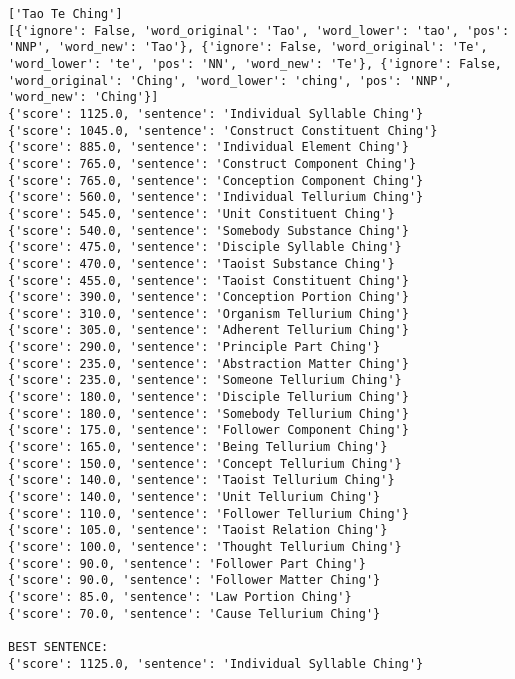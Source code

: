 \documentclass[12pt,a4paper,oneside]{book}
\begin{document}
\begin{verbatim}
['Tao Te Ching']
[{'ignore': False, 'word_original': 'Tao', 'word_lower': 'tao', 'pos': 'NNP', 'word_new': 'Tao'}, {'ignore': False, 'word_original': 'Te', 'word_lower': 'te', 'pos': 'NN', 'word_new': 'Te'}, {'ignore': False, 'word_original': 'Ching', 'word_lower': 'ching', 'pos': 'NNP', 'word_new': 'Ching'}]
{'score': 1125.0, 'sentence': 'Individual Syllable Ching'}
{'score': 1045.0, 'sentence': 'Construct Constituent Ching'}
{'score': 885.0, 'sentence': 'Individual Element Ching'}
{'score': 765.0, 'sentence': 'Construct Component Ching'}
{'score': 765.0, 'sentence': 'Conception Component Ching'}
{'score': 560.0, 'sentence': 'Individual Tellurium Ching'}
{'score': 545.0, 'sentence': 'Unit Constituent Ching'}
{'score': 540.0, 'sentence': 'Somebody Substance Ching'}
{'score': 475.0, 'sentence': 'Disciple Syllable Ching'}
{'score': 470.0, 'sentence': 'Taoist Substance Ching'}
{'score': 455.0, 'sentence': 'Taoist Constituent Ching'}
{'score': 390.0, 'sentence': 'Conception Portion Ching'}
{'score': 310.0, 'sentence': 'Organism Tellurium Ching'}
{'score': 305.0, 'sentence': 'Adherent Tellurium Ching'}
{'score': 290.0, 'sentence': 'Principle Part Ching'}
{'score': 235.0, 'sentence': 'Abstraction Matter Ching'}
{'score': 235.0, 'sentence': 'Someone Tellurium Ching'}
{'score': 180.0, 'sentence': 'Disciple Tellurium Ching'}
{'score': 180.0, 'sentence': 'Somebody Tellurium Ching'}
{'score': 175.0, 'sentence': 'Follower Component Ching'}
{'score': 165.0, 'sentence': 'Being Tellurium Ching'}
{'score': 150.0, 'sentence': 'Concept Tellurium Ching'}
{'score': 140.0, 'sentence': 'Taoist Tellurium Ching'}
{'score': 140.0, 'sentence': 'Unit Tellurium Ching'}
{'score': 110.0, 'sentence': 'Follower Tellurium Ching'}
{'score': 105.0, 'sentence': 'Taoist Relation Ching'}
{'score': 100.0, 'sentence': 'Thought Tellurium Ching'}
{'score': 90.0, 'sentence': 'Follower Part Ching'}
{'score': 90.0, 'sentence': 'Follower Matter Ching'}
{'score': 85.0, 'sentence': 'Law Portion Ching'}
{'score': 70.0, 'sentence': 'Cause Tellurium Ching'}

BEST SENTENCE:
{'score': 1125.0, 'sentence': 'Individual Syllable Ching'}


\end{verbatim}
\end{document}
